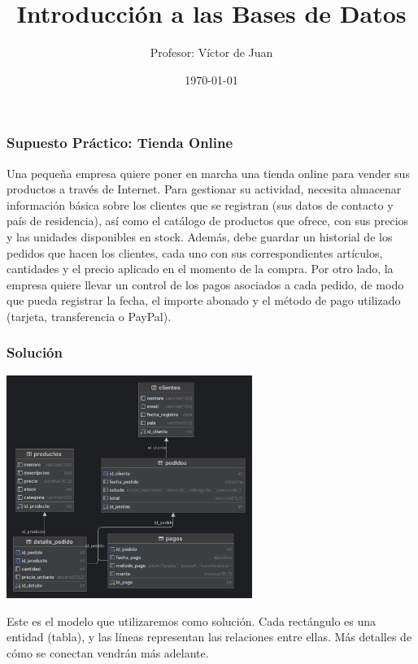 \documentclass{beamer}
\title{Introducción a las Bases de Datos}
\author{Profesor: Víctor de Juan}
\date{\today}
\begin{document}

\begin{frame}
  \titlepage
\end{frame}

\begin{frame}
  \frametitle{Supuesto Práctico: Tienda Online}
Una pequeña empresa quiere poner en marcha una tienda online para vender sus productos a través de Internet.
Para gestionar su actividad, necesita almacenar información básica sobre los clientes que se registran
(sus datos de contacto y país de residencia), así como el catálogo de productos que ofrece, con sus precios y
las unidades disponibles en stock.
%
Además, debe guardar un historial de los pedidos que hacen los clientes,
cada uno con sus correspondientes artículos, cantidades y el precio aplicado en el momento de la compra.
%
Por otro lado, la empresa quiere llevar un control de los pagos asociados a cada pedido, de modo que pueda registrar la fecha,
el importe abonado y el método de pago utilizado (tarjeta, transferencia o PayPal).

\end{frame}


\begin{frame}
  \frametitle{Solución}

  \begin{center}
   \includegraphics[width=0.6\textwidth]{../../dbs/tiendaonline/tiendaonline-ER} %
  \end{center}

  Este es el modelo que utilizaremos como solución.
  Cada rectángulo es una entidad (tabla), y las líneas representan las relaciones entre ellas.
  Más detalles de cómo se conectan vendrán más adelante.

\end{frame}
\end{document}
